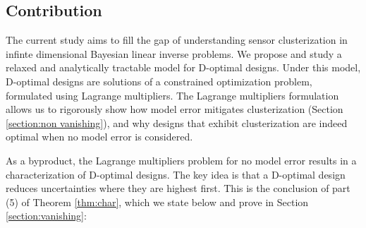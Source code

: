 \subsection{Contribution}
The current study aims to fill the gap of understanding sensor
clusterization in infinte dimensional Bayesian linear inverse
problems. We propose and study a relaxed and analytically tractable
model for D-optimal designs. Under this model, D-optimal designs are
solutions of a constrained optimization problem, formulated using
Lagrange multipliers. The Lagrange multipliers formulation allows us
to rigorously show how model error mitigates clusterization (Section
\ref{section:non vanishing}), and why designs that exhibit
clusterization are indeed optimal when no model error is considered.

As a byproduct, the Lagrange multipliers problem for no model error
results in a characterization of D-optimal designs. The key idea is
that a D-optimal design reduces uncertainties where they are highest
first. This is the conclusion of part (5) of Theorem \ref{thm:char},
which we state below and prove in Section \ref{section:vanishing}:


